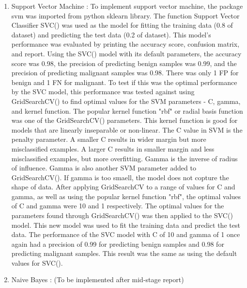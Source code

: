 \documentclass[conference]{IEEEtran}
\begin{document}
\begin{enumerate}
    \item Support Vector Machine : To implement support vector machine, the package svm was imported from python sklearn library. The function Support Vector Classifier SVC() was used as the model for fitting the training data (0.8 of dataset) and predicting the test data (0.2 of dataset). This model's performance was evaluated by printing the accuracy score, confusion matrix, and report. Using the SVC() model with its default parameters, the accuracy score was 0.98, the precision of predicting benign samples was 0.99, and the precision of predicting malignant samples was 0.98. There was only 1 FP for benign and 1 FN for malignant. 
	To test if this was the optimal performance by the SVC model, this performance was tested against using GridSearchCV() to find optimal values for the SVM parameters - C, gamma, and kernel function. The popular kernel function "rbf" or radial basis function was one of the GridSearchCV() parameters. This kernel function is good for models that are linearly inseparable or non-linear. The C value in SVM is the penalty parameter. A smaller C results in wider margin but more misclassified examples. A larger C results in smaller margin and less misclassified examples, but more overfitting. Gamma is the inverse of radius of influence. Gamma is also another SVM parameter added to GridSearchCV(). If gamma is too smaell, the model does not copture the shape of data. After applying GridSearchCV to a range of values for C and gamma, as well as using the popular kernel function "rbf", the optimal values of C and gamma were 10 and 1 respectively. 
	The optimal values for the parameters found through GridSearchCV() was then applied to the SVC() model. This new model was used to fit the training data and predict the test data. The performance of the SVC model with C of 10 and gamma of 1 once again had a precision of 0.99 for predicting benign samples and 0.98 for predicting malignant samples. This result was the same as using the default values for SVC(). 

    \item Naive Bayes : (To be implemented after mid-stage report)
\end{enumerate}




\end{document}
